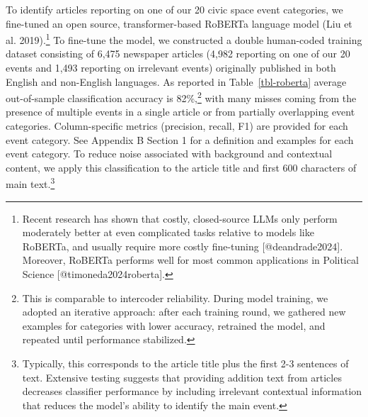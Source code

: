 \documentclass[
  letterpaper,
  DIV=11,
  numbers=noendperiod]{scrartcl}
\begin{document}
To identify articles reporting on one of our 20 civic space event
categories, we fine-tuned an open source, transformer-based RoBERTa
language model (Liu et al.
2019).\footnote{Recent research has shown that costly, closed-source LLMs only perform moderately better at even complicated tasks relative to models like RoBERTa, and usually require more costly fine-tuning [@deandrade2024]. Moreover, RoBERTa performs well for most common applications in Political Science [@timoneda2024roberta].}
To fine-tune the model, we constructed a double human-coded training
dataset consisting of 6,475 newspaper articles (4,982 reporting on one
of our 20 events and 1,493 reporting on irrelevant events) originally
published in both English and non-English languages. As reported in
Table~\ref{tbl-roberta} average out-of-sample classification accuracy is
82\%,\footnote{This is comparable to intercoder reliability. During model training, we adopted an iterative approach: after each training round, we gathered new examples for categories with lower accuracy, retrained the model, and repeated until performance stabilized.}
with many misses coming from the presence of multiple events in a single
article or from partially overlapping event categories. Column-specific
metrics (precision, recall, F1) are provided for each event category.
See Appendix B Section 1 for a definition and examples for each event
category. To reduce noise associated with background and contextual
content, we apply this classification to the article title and first 600
characters of main
text.\footnote{Typically, this corresponds to the article title plus the first 2-3 sentences of text. Extensive testing suggests that providing addition text from articles decreases classifier performance by including irrelevant contextual information that reduces the model's ability to identify the main event.}
\end{document}
